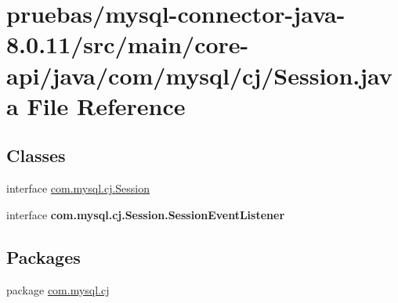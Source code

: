 \hypertarget{core-api_2java_2com_2mysql_2cj_2_session_8java}{}\section{pruebas/mysql-\/connector-\/java-\/8.0.11/src/main/core-\/api/java/com/mysql/cj/\+Session.java File Reference}
\label{core-api_2java_2com_2mysql_2cj_2_session_8java}
\subsection*{Classes}
\begin{DoxyCompactItemize}
\item 
interface \mbox{\hyperlink{interfacecom_1_1mysql_1_1cj_1_1_session}{com.\+mysql.\+cj.\+Session}}
\item 
interface {\bfseries com.\+mysql.\+cj.\+Session.\+Session\+Event\+Listener}
\end{DoxyCompactItemize}
\subsection*{Packages}
\begin{DoxyCompactItemize}
\item 
package \mbox{\hyperlink{namespacecom_1_1mysql_1_1cj}{com.\+mysql.\+cj}}
\end{DoxyCompactItemize}
